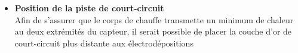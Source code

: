 \begin{itemize}
    \item \textbf{Position de la piste de court-circuit}\\
          Afin de s'assurer que le corps de chauffe transmette un minimum de chaleur au deux extrémités du capteur, il serait possible de placer la couche
          d'or de court-circuit plus distante aux électrodépositions
\end{itemize}

